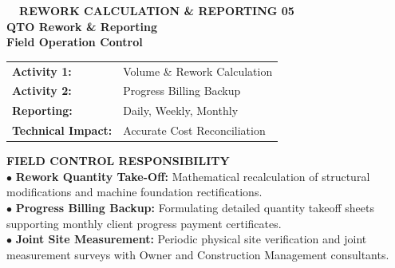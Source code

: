 \documentclass[10pt,a4paper,landscape]{article}
\begin{document}
\noindent
\begin{minipage}[t]{0.30\linewidth}
  \vspace{0pt}
  \begin{tcolorbox}[sharp corners, boxrule=0.8pt, colframe=pborder, colback=white, left=3mm, right=3mm, top=2.5mm, bottom=2.5mm, height=98mm]
    \colorbox{pred}{\fontsize{7pt}{8pt}\selectfont\bfseries\color{white}\ \ REWORK CALCULATION \& REPORTING 05\ \ }\\[1.5mm]
    {\fontsize{9.5pt}{11.5pt}\selectfont\bfseries\color{pnavy}QTO Rework \& Reporting}\\[0.5mm]
    {\fontsize{7pt}{8.5pt}\selectfont\bfseries\color{pred}Field Operation Control}\\[2mm]

    \begin{tcolorbox}[sharp corners, boxrule=0.5pt, colframe=pborder, colback=pbglight, left=2mm, right=2mm, top=1.5mm, bottom=1.5mm]
      \begin{tabularx}{\linewidth}{@{}p{22mm} X@{}}
        {\fontsize{6.8pt}{8pt}\selectfont\bfseries Activity 1:} & {\fontsize{6.8pt}{8pt}\selectfont Volume \& Rework Calculation} \\[0.8mm]
        {\fontsize{6.8pt}{8pt}\selectfont\bfseries Activity 2:} & {\fontsize{6.8pt}{8pt}\selectfont Progress Billing Backup} \\[0.8mm]
        {\fontsize{6.8pt}{8pt}\selectfont\bfseries Reporting:} & {\fontsize{6.8pt}{8pt}\selectfont Daily, Weekly, Monthly} \\[0.8mm]
        {\fontsize{6.8pt}{8pt}\selectfont\bfseries Technical Impact:} & {\fontsize{6.8pt}{8pt}\selectfont Accurate Cost Reconciliation}
      \end{tabularx}
    \end{tcolorbox}
    \vspace{1.5mm}

    {\fontsize{7.5pt}{9pt}\selectfont\bfseries\color{pnavy}FIELD CONTROL RESPONSIBILITY}\\[0.8mm]
    {\fontsize{6.5pt}{8.2pt}\selectfont\color{psteel}
    $\bullet$ \textbf{Rework Quantity Take-Off:} Mathematical recalculation of structural modifications and machine foundation rectifications.\\
    $\bullet$ \textbf{Progress Billing Backup:} Formulating detailed quantity takeoff sheets supporting monthly client progress payment certificates.\\
    $\bullet$ \textbf{Joint Site Measurement:} Periodic physical site verification and joint measurement surveys with Owner and Construction Management consultants.
    }
  \end{tcolorbox}
  \vspace{2mm}


\end{minipage}
\end{document}
